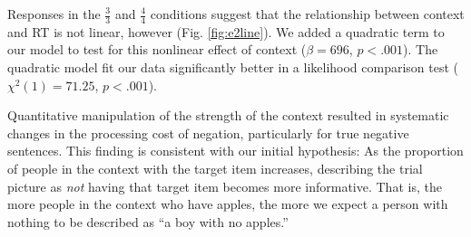 \documentclass[10pt,letterpaper]{article}
\begin{document}
Responses in the $\frac{3}{3}$ and $\frac{4}{4}$ conditions suggest that the relationship between context and RT is not linear, however (Fig. \ref{fig:e2line}).  We added a quadratic term to our model to test for this nonlinear effect of context ($\beta= 696 $, $p< .001$).  The quadratic model fit our data significantly better in a likelihood comparison test ($\chi^{2}(1) = 71.25$, $p<.001$).  

Quantitative manipulation of the strength of the context resulted in systematic changes in the processing cost of negation, particularly for true negative sentences.  This finding is consistent with our initial hypothesis: As the proportion of people in the context with the target item increases, describing the trial picture as \emph{not} having that target item becomes more informative.  That is, the more people in the context who have apples, the more we expect a person with nothing to be described as ``a boy with no apples.'' 

\end{document}
